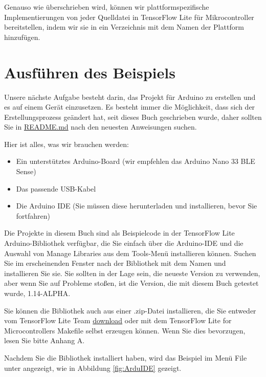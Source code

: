 Genauso wie  überschrieben wird, können wir plattformspezifische Implementierungen von jeder Quelldatei in TensorFlow Lite für Mikrocontroller bereitstellen, indem wir sie in ein Verzeichnis mit dem Namen der Plattform hinzufügen.

     
\section{Ausführen des Beispiels}
     
Unsere nächste Aufgabe besteht darin, das Projekt für Arduino zu erstellen und es auf einem Gerät einzusetzen. 	Es besteht immer die Möglichkeit, dass sich der Erstellungsprozess geändert hat, seit dieses Buch geschrieben wurde, daher sollten Sie in \href{https://oreil.ly/s2mj1}{README.md} nach den neuesten Anweisungen suchen.
     
Hier ist alles, was wir brauchen werden:

\begin{itemize}
    \item Ein unterstütztes Arduino-Board (wir empfehlen das Arduino Nano 33 BLE Sense)
    \item Das passende USB-Kabel 
    \item Die Arduino IDE (Sie müssen diese herunterladen und installieren, bevor Sie fortfahren)
\end{itemize}
     
 Die Projekte in diesem Buch sind als Beispielcode in der TensorFlow Lite Arduino-Bibliothek verfügbar, die Sie einfach über die Arduino-IDE und die Auswahl von Manage Libraries aus dem Tools-Menü installieren können. Suchen Sie im erscheinenden Fenster nach der Bibliothek mit dem Namen  und installieren Sie sie. Sie sollten in der Lage sein, die neueste Version zu verwenden, aber wenn Sie auf Probleme stoßen, ist die Version, die mit diesem Buch getestet wurde, 1.14-ALPHA.
     
Sie können die Bibliothek auch aus einer .zip-Datei installieren, die Sie entweder vom TensorFlow Lite Team \href{https://oreil.ly/blgB8}{download} oder mit dem TensorFlow Lite for Microcontrollers Makefile selbst erzeugen können. Wenn Sie dies bevorzugen, lesen Sie bitte Anhang A.

Nachdem Sie die Bibliothek installiert haben, wird das Beispiel im Menü File unter  angezeigt, wie in Abbildung \ref{fig:ArduIDE} gezeigt.	

